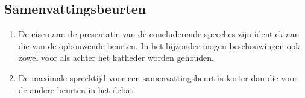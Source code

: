 \subsection{Samenvattingsbeurten}

\begin{enumerate}
\item De eisen aan de presentatie van de concluderende speeches zijn identiek aan die van de opbouwende beurten. In het bijzonder mogen beschouwingen ook zowel voor als achter het katheder worden gehouden.
\item De maximale spreektijd voor een samenvattingsbeurt is korter dan die voor de andere beurten in het debat.
\end{enumerate}

